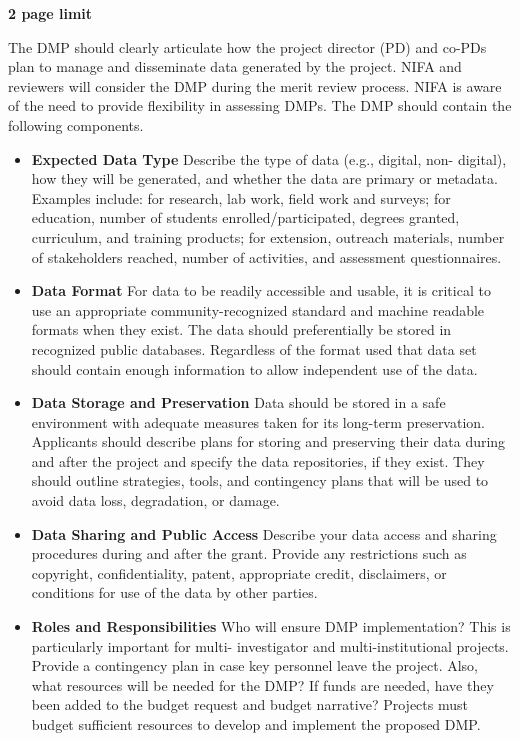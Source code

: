 \documentclass[12pt,letterpaper]{article}
\title{\ruleline{Data Management Plan}}
\begin{document}
\maketitle
\linenumbers

\textbf{2 page limit}

The DMP should clearly articulate how the project director (PD) and co-PDs plan
to manage and disseminate data generated by the project. NIFA and reviewers will
consider the DMP during the merit review process. NIFA is aware of the need to
provide flexibility in assessing DMPs. The DMP should contain the following
components.

\begin{itemize}

  \item \textbf{Expected Data Type} Describe the type of data (e.g., digital,
	non- digital), how they will be generated, and whether the data are primary
	or metadata. Examples include: for research, lab work, field work and
	surveys; for education, number of students enrolled/participated, degrees
	granted, curriculum, and training products; for extension, outreach
	materials, number of stakeholders reached, number of activities, and
	assessment questionnaires.
  \item \textbf{Data Format}
	For data to be readily accessible and usable, it is critical to use an
	appropriate community-recognized standard and machine readable formats when
	they exist. The data should preferentially be stored in recognized public
	databases. Regardless of the format used that data set should contain enough
	information to allow independent use of the data.
  \item \textbf{Data Storage and Preservation}
	Data should be stored in a safe environment with adequate measures taken for
	its long-term preservation. Applicants should describe plans for storing and
	preserving their data during and after the project and specify the data
	repositories, if they exist. They should outline strategies, tools, and
	contingency plans that will be used to avoid data loss, degradation, or
	damage.
  \item \textbf{Data Sharing and Public Access}
	Describe your data access and sharing procedures during and after the grant.
	Provide any restrictions such as copyright, confidentiality, patent,
	appropriate credit, disclaimers, or conditions for use of the data by other
	parties.
  \item \textbf{Roles and Responsibilities}
	Who will ensure DMP implementation? This is particularly important for
	multi- investigator and multi-institutional projects. Provide a contingency
	plan in case key personnel leave the project. Also, what resources will be
	needed for the DMP? If funds are needed, have they been added to the budget
	request and budget narrative? Projects must budget sufficient resources to
	develop and implement the proposed DMP.

\end{itemize}
\end{document}
